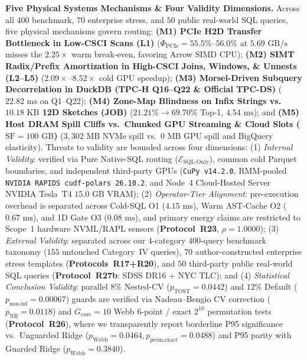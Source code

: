 \documentclass[10pt,a4paper]{article}
\begin{document}
\par\noindent\textbf{Five Physical Systems Mechanisms \& Four Validity Dimensions.} Across all $400$ benchmark, $70$ enterprise stress, and $50$ public real-world SQL queries, five physical mechanisms govern routing: \textbf{(M1) PCIe H2D Transfer Bottleneck in Low-CSCI Scans (L1)} ($\Phi_{\text{PCIe}}=55.5\%\text{--}56.0\%$ at $5.69\text{ GB/s}$ misses the $2.25\times$ warm break-even, favoring Arrow SIMD CPU); \textbf{(M2) SIMT Radix/Prefix Amortization in High-CSCI Joins, Windows, \& Unnests (L2--L5)} ($2.09\times\text{--}8.52\times$ cold GPU speedup); \textbf{(M3) Morsel-Driven Subquery Decorrelation in DuckDB (TPC-H Q16--Q22 \& Official TPC-DS)} ($22.82\text{ ms}$ on Q1--Q22); \textbf{(M4) Zone-Map Blindness on Infix Strings vs.\ $10.18\text{ KB}$ 12D Sketches (JOB)} ($21.21\%\rightarrow 69.70\%$ Top-1, $4.54\text{ ms}$); and \textbf{(M5) Host DRAM Spill Cliffs vs.\ Chunked GPU Streaming \& Cloud Slots ($\text{SF}=100\text{ GB}$)} ($3{,}302\text{ MB}$ NVMe spill vs.\ $0\text{ MB}$ GPU spill and BigQuery elasticity). Threats to validity are bounded across four dimensions: (1) \emph{Internal Validity}: verified via Pure Native-SQL routing ($\mathcal{E}_{\text{SQL-Only}}$), common cold Parquet boundaries, and independent third-party GPUs (\texttt{CuPy v14.2.0}, RMM-pooled \texttt{NVIDIA RAPIDS cudf-polars 26.10.2}, and Node~4 Cloud-Hosted Server NVIDIA Tesla~T4 $15.0\text{ GB}$ VRAM); (2) \emph{Operator-Tier Alignment}: pre-execution overhead is separated across Cold-SQL O1 ($4.15\text{ ms}$), Warm AST-Cache O2 ($0.67\text{ ms}$), and 1D Gate O3 ($0.08\text{ ms}$), and primary energy claims are restricted to Scope~1 hardware NVML/RAPL sensors (\textbf{Protocol~R23}, $\rho=1.0000$); (3) \emph{External Validity}: separated across our 4-category 400-query benchmark taxonomy ($155$ untouched Category~IV queries), $70$ author-constructed enterprise stress templates (\textbf{Protocols~R17+R20}), and $50$ third-party public real-world SQL queries (\textbf{Protocol~R27b}: SDSS DR16 + NYC TLC); and (4) \emph{Statistical Conclusion Validity}: parallel $8\%$ Nested-CV ($p_{\text{TOST}}=0.0442$) and $12\%$ Default ($p_{\text{non-inf}}=0.00067$) guards are verified via Nadeau--Bengio CV correction ($p_{\text{NB}}=0.0118$) and $G_{\text{core}}=10$ Webb 6-point / exact $2^{10}$ permutation tests (\textbf{Protocol~R26}), where we transparently report borderline P95 significance vs.\ Unguarded Ridge ($p_{\text{Webb}}=0.0464, p_{\text{perm,exact}}=0.0488$) and P95 parity with Guarded Ridge ($p_{\text{Webb}}=0.3840$).
\end{document}
